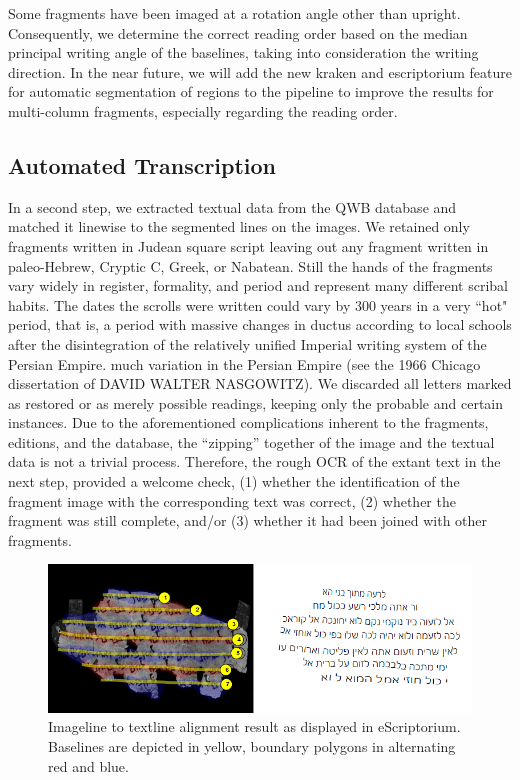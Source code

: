 Some fragments have been imaged at a rotation angle other than upright.
Consequently, we determine the correct reading order based on the median
principal writing angle of the baselines, taking into consideration the writing
direction.  In the near future, we will add the new kraken and escriptorium
feature for automatic segmentation of regions to the pipeline to improve the
results for multi-column fragments, especially regarding the reading
order\cite{KiesslingICFHR2020}. 

\subsection{Automated Transcription}\label{sec:trans}\label{sec:id}

In a second step, we extracted textual data from the QWB database and matched
it linewise to the segmented lines on the images.  We retained only fragments
written in Judean square script leaving out any fragment written in
paleo-Hebrew, Cryptic C, Greek, or Nabatean.  Still the hands of the fragments
vary widely in register, formality, and period and represent many different
scribal habits.  The dates the scrolls were written could vary by 300 years in
a very ``hot" period, that is, a period with massive changes in ductus
according to local schools after the disintegration of the relatively unified
Imperial writing system of the Persian Empire. %
much variation in the Persian Empire (see the 1966 Chicago dissertation of
DAVID WALTER NASGOWITZ).  We discarded all letters marked as restored or as
merely possible readings, keeping only the probable and certain instances.  Due
to the aforementioned complications inherent to the fragments, editions, and
the database, the ``zipping'' together of the image and the textual data is not
a trivial process.  Therefore, the rough OCR of the extant text in the next
step, provided a welcome check, (1) whether the identification of the fragment
image with the corresponding text was correct, (2) whether the fragment was
still complete, and/or (3) whether it had been joined with other fragments.

\begin{figure}[t]%
	\includegraphics[width=1\columnwidth]{images/40b.PNG}
	\caption{Imageline to textline alignment result as displayed in
	eScriptorium. Baselines are depicted in yellow, boundary polygons in
	alternating red and blue.} \vspace*{-5mm} \label{fig:alignment_result}
\end{figure}

